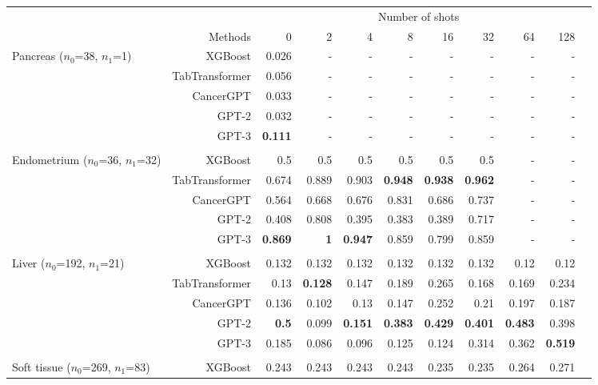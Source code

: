 \begin{adjustwidth}{-2.5cm}{-2.5cm}\centering\begin{threeparttable}[!htb]
\scriptsize
\begin{tabular}{lrrrrrrrrrr}\toprule
& &\multicolumn{8}{c}{Number of shots} \\\cmidrule{3-10}
&Methods &0 &2 &4 &8 &16 &32 &64 &128 \\\midrule
\multirowcell{5}{Pancreas \\ ($n_0$=38, $n_1$=1)} &XGBoost &0.026 &- &- &- &- &- &- &- \\
&TabTransformer &0.056 &- &- &- &- &- &- &- \\
&CancerGPT &0.033 &- &- &- &- &- &- &- \\
&GPT-2 &0.032 &- &- &- &- &- &- &- \\
&GPT-3 &\textbf{0.111} &- &- &- &- &- &- &- \\
& & & & & & & & & \\
\multirowcell{5}{Endometrium \\ ($n_0$=36, $n_1$=32)} &XGBoost &0.5 &0.5 &0.5 &0.5 &0.5 &0.5 &- &- \\
&TabTransformer &0.674 &0.889 &0.903 &\textbf{0.948} &\textbf{0.938} &\textbf{0.962} &- &- \\
&CancerGPT &0.564 &0.668 &0.676 &0.831 &0.686 &0.737 &- &- \\
&GPT-2 &0.408 &0.808 &0.395 &0.383 &0.389 &0.717 &- &- \\
&GPT-3 &\textbf{0.869} &\textbf{1} &\textbf{0.947} &0.859 &0.799 &0.859 &- &- \\ \\
\multirowcell{5}{Liver \\ ($n_0$=192, $n_1$=21)} &XGBoost &0.132 &0.132 &0.132 &0.132 &0.132 &0.132 &0.12 &0.12 \\
&TabTransformer &0.13 &\textbf{0.128} &0.147 &0.189 &0.265 &0.168 &0.169 &0.234 \\
&CancerGPT &0.136 &0.102 &0.13 &0.147 &0.252 &0.21 &0.197 &0.187 \\
&GPT-2 &\textbf{0.5} &0.099 &\textbf{0.151} &\textbf{0.383} &\textbf{0.429} &\textbf{0.401} &\textbf{0.483} &0.398 \\
&GPT-3 &0.185 &0.086 &0.096 &0.125 &0.124 &0.314 &0.362 &\textbf{0.519} \\ \\
\multirowcell{5}{Soft tissue \\ ($n_0$=269, $n_1$=83)} &XGBoost &0.243 &0.243 &0.243 &0.243 &0.235 &0.235 &0.264 &0.271 \\

\end{tabular}
\end{threeparttable}
\end{adjustwidth}
